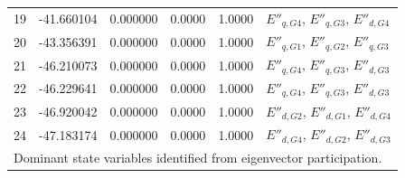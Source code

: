 \begin{tabular}{r r r r r p{4.5cm}}
19 & -41.660104 & 0.000000 & 0.0000 & 1.0000 & $E''_{q,G4}$, $E''_{q,G3}$, $E''_{d,G4}$\\
20 & -43.356391 & 0.000000 & 0.0000 & 1.0000 & $E''_{q,G1}$, $E''_{q,G2}$, $E''_{q,G3}$\\
21 & -46.210073 & 0.000000 & 0.0000 & 1.0000 & $E''_{q,G4}$, $E''_{q,G3}$, $E''_{d,G3}$\\
22 & -46.229641 & 0.000000 & 0.0000 & 1.0000 & $E''_{q,G4}$, $E''_{q,G3}$, $E''_{d,G3}$\\
23 & -46.920042 & 0.000000 & 0.0000 & 1.0000 & $E''_{d,G2}$, $E''_{d,G1}$, $E''_{d,G4}$\\
24 & -47.183174 & 0.000000 & 0.0000 & 1.0000 & $E''_{d,G4}$, $E''_{d,G2}$, $E''_{d,G3}$\\
\bottomrule
\multicolumn{6}{l}{\scriptsize Dominant state variables identified from eigenvector participation.}
\end{tabular}
\endgroup
